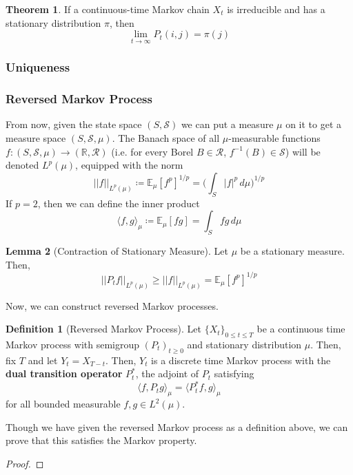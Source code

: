 \documentclass{article}
\theoremstyle{definition}
\newtheorem{theorem}{Theorem}[section]
\newtheorem{lemma}[theorem]{Lemma}
\theoremstyle{remark}
\theoremstyle{definition}
\newtheorem{definition}{Definition}[section]
\begin{document}
\begin{theorem}
If a continuous-time Markov chain $X_t$ is irreducible and has a stationary distribution $\pi$, then 
\[\lim_{t \rightarrow \infty} P_t (i, j) = \pi(j)\]
\end{theorem}

\subsubsection{Uniqueness} 

\subsubsection{Reversed Markov Process}

From now, given the state space $(S, \mathcal{S})$ we can put a measure $\mu$ on it to get a measure space $(S, \mathcal{S}, \mu)$. The Banach space of all $\mu$-measurable functions $f: (S, \mathcal{S}, \mu) \rightarrow (\mathbb{R}, \mathcal{R})$ (i.e. for every Borel $B \in \mathcal{R}$, $f^{-1}(B) \in \mathcal{S}$) will be denoted $L^p (\mu)$, equipped with the norm 
\[||f||_{L^p(\mu)} \coloneqq \mathbb{E}_\mu [f^p]^{1/p} = \bigg( \int_S |f|^p \,d\mu \bigg)^{1/p}\]
If $p = 2$, then we can define the inner product 
\[\langle f, g \rangle_\mu \coloneqq \mathbb{E}_\mu [f g] = \int_S f g \, d\mu\]

\begin{lemma}[Contraction of Stationary Measure]
Let $\mu$ be a stationary measure. Then, 
\[||P_t f||_{L^p(\mu)} \geq ||f||_{L^p (\mu)} = \mathbb{E}_\mu [f^p]^{1/p}\]
\end{lemma}

Now, we can construct reversed Markov processes. 

\begin{definition}[Reversed Markov Process]
Let $\{X_t\}_{0 \leq t \leq T}$ be a continuous time Markov process with semigroup $(P_t)_{t \geq 0}$ and stationary distribution $\mu$. Then, fix $T$ and let $Y_t = X_{T - t}$. Then, $Y_t$ is a discrete time Markov process with the \textbf{dual transition operator} $P_t^*$, the adjoint of $P_t$ satisfying 
\[\langle f, P_t g \rangle_\mu = \langle P_t^* f, g \rangle_\mu\]
for all bounded measurable $f, g \in L^2 (\mu)$. 
\end{definition}

Though we have given the reversed Markov process as a definition above, we can prove that this satisfies the Markov property. 

\begin{proof}

\end{proof}
\end{document}
